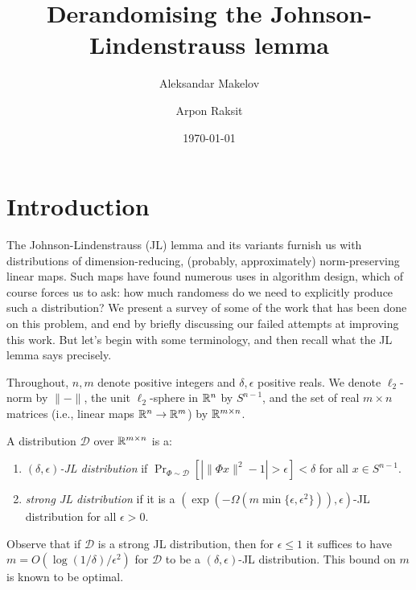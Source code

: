 


\title{Derandomising the Johnson-Lindenstrauss lemma}
\author{Aleksandar Makelov \and Arpon Raksit}
\date{\today}

\setlength{\parindent}{1em}


\maketitle
\thispagestyle{fancy}

\setcounter{tocdepth}{1}
\tableofcontents


\renewcommand{\D}{\mathcal{D}}

\section{Introduction}

The Johnson-Lindenstrauss (JL) lemma and its variants furnish us with
distributions of dimension-reducing, (probably, approximately)
norm-preserving linear maps. Such maps have found numerous uses in
algorithm design, which of course forces us to ask: how much randomess
do we need to explicitly produce such a distribution? We present a
survey of some of the work that has been done on this problem, and end
by briefly discussing our failed attempts at improving this work. But
let's begin with some terminology, and then recall what the JL lemma
says precisely.

\begin{notation}
  Throughout, $n,m$ denote positive integers and $\delta,\epsilon$
  positive reals. We denote $\ell_2$-norm by $\|{-}\|$, the unit
  $\ell_2$-sphere in $\mathbb{R}^n$ by $S^{n-1}$, and the set of real $m
  \times n$ matrices (i.e., linear maps $\mathbb{R}^n \to \mathbb{R}^m$) by $\mathbb{R}^{m
    \times n}$.
\end{notation}

\begin{definitions}
  A distribution $\D$ over $\mathbb{R}^{m \times n}$ is a:
  \begin{enumerate}
  \item \emph{$(\delta,\epsilon)$-JL distribution} if $\Pr_{\Phi \sim
    \D} [|\|\Phi x\|^2 - 1| > \epsilon] < \delta$ for all $x \in
    S^{n-1}$.
  \item \emph{strong JL distribution} if it is a $(\exp(-\Omega(m \min
    \{\epsilon,\epsilon^2\})),\epsilon)$-JL distribution for all
    $\epsilon > 0$.
  \end{enumerate}
  Observe that if $\D$ is a strong JL distribution, then for $\epsilon
  \le 1$ it suffices to have $m = O(\log(1/\delta)/\epsilon^2)$ for
  $\D$ to be a $(\delta,\epsilon)$-JL distribution. This bound on $m$
  is known to be optimal.
\end{definitions}

